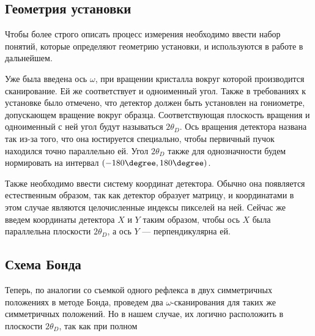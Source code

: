 \subsection{Геометрия установки}

Чтобы более строго описать процесс измерения необходимо ввести набор понятий, которые определяют геометрию установки, и используются в работе в дальнейшем.

Уже была введена ось $\omega$, при вращении кристалла вокруг которой производится сканирование.
Ей же соответствует и одноименный угол.
Также в требованиях к установке было отмечено, что детектор должен быть установлен на гониометре, допускающем вращение вокруг образца.
Соответствующая плоскость вращения и одноименный с ней угол будут называться $2\theta_D$.
Ось вращения детектора названа так из-за того, что она юстируется специально, чтобы первичный пучок находился точно параллельно ей.
Угол $2\theta_D$ также для однозначности будем нормировать на интервал $(-180\degree, 180\degree)$.

Также необходимо ввести систему координат детектора.
Обычно она появляется естественным образом, так как детектор образует матрицу, и координатами в этом случае являются целочисленные индексы пикселей на ней.
Сейчас же введем координаты детектора $X$ и $Y$ таким образом, чтобы ось $X$ была параллельна плоскости $2\theta_D$, а ось $Y$ --- перпендикулярна ей.

\subsection{Схема Бонда}

Теперь, по аналогии со съемкой одного рефлекса в двух симметричных положениях в методе Бонда, проведем два $\omega$-сканирования для таких же симметричных положений.
Но в нашем случае, их логично расположить в плоскости $2\theta_D$, так как при полном  